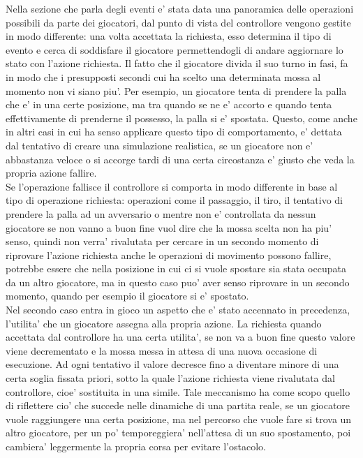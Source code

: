 Nella sezione che parla degli eventi e’ stata data una panoramica delle operazioni possibili da parte dei giocatori, dal punto di vista del controllore vengono gestite in modo differente: una volta accettata la richiesta, esso determina il tipo di evento e cerca di soddisfare il giocatore permettendogli di andare aggiornare lo stato con l’azione richiesta. Il fatto che il giocatore divida il suo turno in fasi, fa in modo che i presupposti secondi cui ha scelto una determinata mossa al momento non vi siano piu’. Per esempio, un giocatore tenta di prendere la palla che e’ in una certe posizione, ma tra quando se ne e’ accorto e quando tenta effettivamente di prenderne il possesso, la palla si e’ spostata. Questo, come anche in altri casi in cui ha senso applicare questo tipo di comportamento, e’ dettata dal tentativo di creare una simulazione realistica, se un giocatore non e’ abbastanza veloce o si accorge tardi di una certa circostanza e’ giusto che veda la propria azione fallire.\\

Se l’operazione fallisce il controllore si comporta in modo differente in base al tipo di operazione richiesta: operazioni come il passaggio, il tiro, il tentativo di prendere la palla ad un avversario o mentre non e’ controllata da nessun giocatore se non vanno a buon fine vuol dire che la mossa scelta non ha piu’ senso, quindi non verra’ rivalutata per cercare in un secondo momento di riprovare l’azione richiesta anche le operazioni di movimento possono fallire, potrebbe essere che nella posizione in cui ci si vuole spostare sia stata occupata da un altro giocatore, ma in questo caso puo’ aver senso riprovare in un secondo momento, quando per esempio il giocatore si e’ spostato.\\

Nel secondo caso entra in gioco un aspetto che e’ stato accennato in precedenza, l’utilita’ che un giocatore assegna alla propria azione. La richiesta quando accettata dal controllore ha una certa utilita’, se non va a buon fine questo valore viene decrementato e la mossa messa in attesa di una nuova occasione di esecuzione. Ad ogni tentativo il valore decresce fino a diventare minore di una certa soglia fissata priori, sotto la quale l’azione richiesta viene rivalutata dal controllore, cioe’ sostituita in una simile. Tale meccanismo ha come scopo quello di riflettere cio’ che succede nelle dinamiche di una partita reale, se un giocatore vuole raggiungere una certa posizione, ma nel percorso che vuole fare si trova un altro giocatore, per un po’ temporeggiera’ nell’attesa di un suo spostamento, poi cambiera’ leggermente la propria corsa per evitare l’ostacolo.\\

